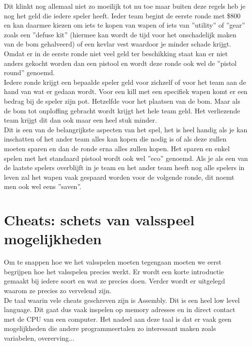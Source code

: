 \documentclass[pdftex,a4paper,12pt,twoside]{report}
\begin{document}
Dit klinkt nog allemaal niet zo moeilijk tot nu toe maar buiten deze regels heb je nog het geld die iedere speler heeft. Ieder team begint de eerste ronde met \$800 en kan daarmee kiezen om iets te kopen van wapen of iets van ''utility'' of ''gear'' zoals een ''defuse kit'' (hiermee kan wordt de tijd voor het onschadelijk maken van de bom gehalveerd) of een kevlar vest waardoor je minder schade krijgt. 
Omdat er in de eerste ronde niet veel geld ter beschikking staat kan er niet anders gekocht worden dan een pistool en wordt deze ronde ook wel de ''pistol round'' genoemd.
\\

Iedere ronde krijgt een bepaalde speler geld voor zichzelf of voor het team aan de hand van wat er gedaan wordt. Voor een kill met een specifiek wapen komt er een bedrag bij de speler zijn pot. Hetzelfde voor het plaatsen van de bom. Maar als de bom tot onploffing gebracht wordt krijgt het hele team geld. Het verliezende team krijgt dit dan ook maar een heel stuk minder.
\\

Dit is een van de belangrijkste aspecten van het spel, het is heel handig als je kan inschatten of het ander team alles kan kopen die nodig is of als deze zullen moeten sparen en dan de ronde erna alles zullen kopen. Het sparen en enkel spelen met het standaard pistool wordt ook wel ''eco'' genoemd. Als je als een van de laatste spelers overblijft in je team en het ander team heeft nog alle spelers in leven zal het wapen vaak gespaard worden voor de volgende ronde, dit noemt men ook wel eens ''saven''.


\chapter{Cheats: schets van valsspeel mogelijkheden}
\label{ch:cheats}

Om te snappen hoe we het valsspelen moeten tegengaan moeten we eerst begrijpen hoe het valsspelen precies werkt. Er wordt een korte introductie gemaakt bij iedere soort en wat ze precies doen. Verder wordt er uitgelegd waarom ze precies zo vervelend zijn.
\\

De taal waarin vele cheats geschreven zijn is Assembly. Dit is een heel low level language. Dit gaat dus vaak inspelen op memory adresses en in direct contact met de CPU van een computer. Het nadeel aan deze taal is dat er vaak geen mogelijkheden die andere programmeertalen zo interessant maken zoals variabelen, overerving...
\citep{assembly}
\end{document}
